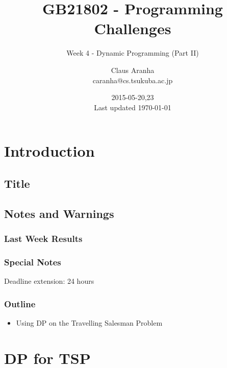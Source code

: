 \documentclass{beamer}
\title[GB21802]{GB21802 - Programming Challenges}
\subtitle[]{Week 4 - Dynamic Programming (Part II)}
\author[Claus Aranha]{Claus Aranha\\{\footnotesize caranha@cs.tsukuba.ac.jp}}
\institute{College of Information Science}
\date{2015-05-20,23\\{\tiny Last updated \today}}
\begin{document}

\section{Introduction}
\subsection{Title}
\begin{frame}
\maketitle
\end{frame}

\subsection{Notes and Warnings}

\begin{frame}
  \frametitle{Last Week Results}
\end{frame}

\begin{frame}
  \frametitle{Special Notes}
  Deadline extension: \alert{24 hours}
\end{frame}

\begin{frame}
  \frametitle{Outline}
  \begin{itemize}
    \item Using DP on the Travelling Salesman Problem
  \end{itemize}
\end{frame}

\section{DP for TSP}
\end{document}
